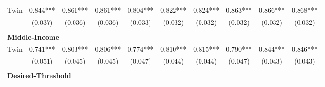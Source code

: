 \begin{landscape}
\begin{table}[htpb!]
\begin{center}
\begin{tabular}{lccccccccc}
Twin&0.844***&0.861***&0.861***&0.804***&0.822***&0.824***&0.863***&0.866***&0.868***\\
&(0.037)&(0.036)&(0.036)&(0.033)&(0.032)&(0.032)&(0.032)&(0.032)&(0.032)\\
\begin{footnotesize}\end{footnotesize}&\begin{footnotesize}\end{footnotesize}&\begin{footnotesize}\end{footnotesize}&\begin{footnotesize}\end{footnotesize}&\begin{footnotesize}\end{footnotesize}&\begin{footnotesize}\end{footnotesize}&\begin{footnotesize}\end{footnotesize}&\begin{footnotesize}\end{footnotesize}&\begin{footnotesize}\end{footnotesize}&\begin{footnotesize}\end{footnotesize}\\\multicolumn{10}{l}{\textbf{Middle-Income}}\\ 
Twin&0.741***&0.803***&0.806***&0.774***&0.810***&0.815***&0.790***&0.844***&0.846***\\
&(0.051)&(0.045)&(0.045)&(0.047)&(0.044)&(0.044)&(0.047)&(0.043)&(0.043)\\
\begin{footnotesize}\end{footnotesize}&\begin{footnotesize}\end{footnotesize}&\begin{footnotesize}\end{footnotesize}&\begin{footnotesize}\end{footnotesize}&\begin{footnotesize}\end{footnotesize}&\begin{footnotesize}\end{footnotesize}&\begin{footnotesize}\end{footnotesize}&\begin{footnotesize}\end{footnotesize}&\begin{footnotesize}\end{footnotesize}&\begin{footnotesize}\end{footnotesize}\\\multicolumn{10}{l}{\textbf{Desired-Threshold}}\\ 

\end{tabular}
\end{center}
\end{table}
\end{landscape}
